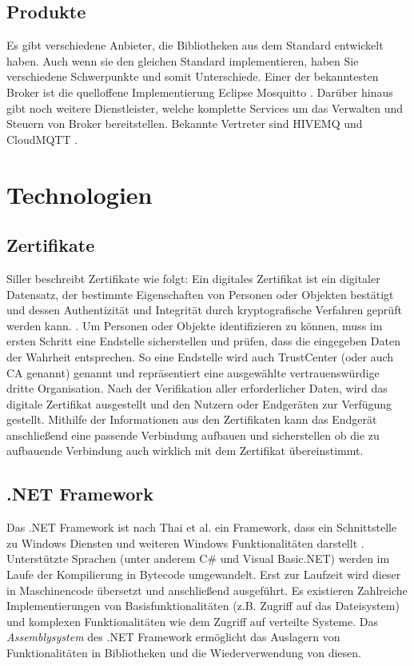     \subsection{Produkte}
        Es gibt verschiedene Anbieter, die Bibliotheken aus dem Standard entwickelt haben. Auch wenn sie den gleichen Standard implementieren, haben Sie verschiedene Schwerpunkte und somit Unterschiede. Einer der bekanntesten Broker ist die quelloffene Implementierung Eclipse Mosquitto \cite{eclipse_foundation_inc_2018}. Darüber hinaus gibt noch weitere Dienstleister, welche komplette Services um das Verwalten und Steuern von Broker bereitstellen. Bekannte Vertreter sind HIVEMQ \cite{hivemq_dc_square_gmbh} und CloudMQTT \cite{84codes_ab_2019}.

\section{Technologien}
        \subsection{Zertifikate}
        Siller beschreibt Zertifikate wie folgt:
        \glqq Ein digitales Zertifikat ist ein digitaler Datensatz, der bestimmte Eigenschaften von Personen oder Objekten bestätigt und dessen Authentizität und Integrität durch kryptografische Verfahren geprüft werden kann.\grqq{} \cite{siller_2018}.
        Um Personen oder Objekte identifizieren zu können, muss im ersten Schritt eine Endstelle sicherstellen und prüfen, dass die eingegeben Daten der Wahrheit entsprechen. So eine Endstelle wird auch TrustCenter (oder auch \ac{CA} genannt) genannt und repräsentiert eine ausgewählte vertrauenswürdige dritte Organisation. Nach der Verifikation aller erforderlicher Daten, wird das digitale Zertifikat ausgestellt und den Nutzern oder Endgeräten zur Verfügung gestellt. Mithilfe der Informationen aus den Zertifikaten kann das Endgerät anschließend eine passende Verbindung aufbauen und sicherstellen ob die zu aufbauende Verbindung auch wirklich mit dem Zertifikat übereinstimmt.
    
    \subsection{.NET Framework}
        Das .NET Framework ist nach Thai et al. ein Framework, dass ein Schnittstelle zu Windows Diensten und weiteren Windows Funktionalitäten darstellt \cite{thai2003net}.
        Unterstützte Sprachen (unter anderem C\# und Visual Basic.NET) werden im Laufe der Kompilierung in Bytecode umgewandelt. Erst zur Laufzeit wird dieser in Maschinencode übersetzt und anschließend ausgeführt. Es existieren Zahlreiche Implementierungen von Basisfunktionalitäten (z.B. Zugriff auf das Dateisystem) und komplexen Funktionalitäten wie dem Zugriff auf verteilte Systeme. 
        Das \emph{Assemblysystem} des .NET Framework ermöglicht das Auslagern von Funktionalitäten in Bibliotheken und die Wiederverwendung von diesen.
        
